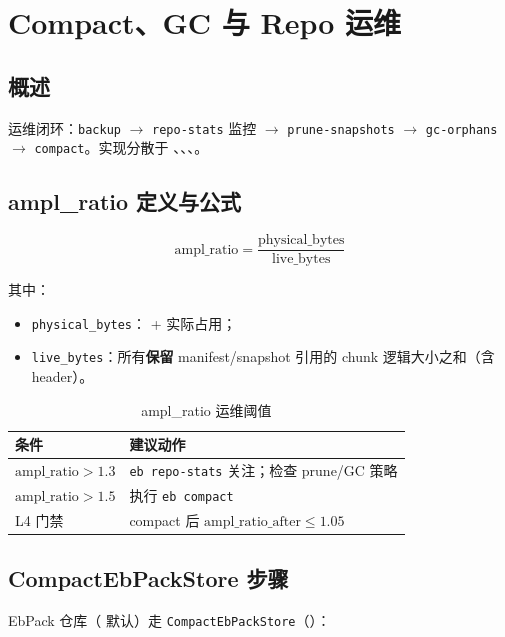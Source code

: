 \chapter{Compact、GC 与 Repo 运维}
\label{ch:compact-gc}

\section{概述}

运维闭环：\texttt{backup} $\rightarrow$ \texttt{repo-stats} 监控 $\rightarrow$ \texttt{prune-snapshots} $\rightarrow$ \texttt{gc-orphans} $\rightarrow$ \texttt{compact}。实现分散于 、、、。

\section{ampl\_ratio 定义与公式}

\[
\text{ampl\_ratio} = \frac{\text{physical\_bytes}}{\text{live\_bytes}}
\]

其中：
\begin{itemize}[nosep]
  \item \texttt{physical\_bytes}： +  实际占用；
  \item \texttt{live\_bytes}：所有\textbf{保留} manifest/snapshot 引用的 chunk 逻辑大小之和（含 header）。
\end{itemize}

\begin{table}[htbp]
\centering
\caption{ampl\_ratio 运维阈值}
\begin{tabular}{@{}ll@{}}
\toprule
条件 & 建议动作 \\
\midrule
$\text{ampl\_ratio} > 1.3$ & \texttt{eb repo-stats} 关注；检查 prune/GC 策略 \\
$\text{ampl\_ratio} > 1.5$ & 执行 \texttt{eb compact} \\
L4 门禁 & compact 后 $\text{ampl\_ratio\_after} \leq 1.05$ \\
\bottomrule
\end{tabular}
\end{table}

\section{CompactEbPackStore 步骤}

EbPack 仓库（ 默认）走 \texttt{CompactEbPackStore}（）：

